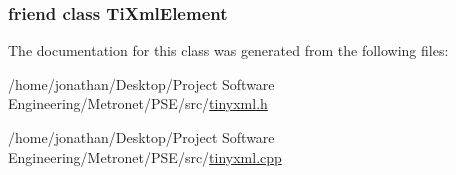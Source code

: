 \subsubsection[{\texorpdfstring{Ti\+Xml\+Element}{TiXmlElement}}]{\setlength{\rightskip}{0pt plus 5cm}friend class {\bf Ti\+Xml\+Element}\hspace{0.3cm}{\ttfamily [friend]}}\hypertarget{class_ti_xml_text_ab6592e32cb9132be517cc12a70564c4b}{}\label{class_ti_xml_text_ab6592e32cb9132be517cc12a70564c4b}


The documentation for this class was generated from the following files\+:\begin{DoxyCompactItemize}
\item 
/home/jonathan/\+Desktop/\+Project Software Engineering/\+Metronet/\+P\+S\+E/src/\hyperlink{tinyxml_8h}{tinyxml.\+h}\item 
/home/jonathan/\+Desktop/\+Project Software Engineering/\+Metronet/\+P\+S\+E/src/\hyperlink{tinyxml_8cpp}{tinyxml.\+cpp}\end{DoxyCompactItemize}
